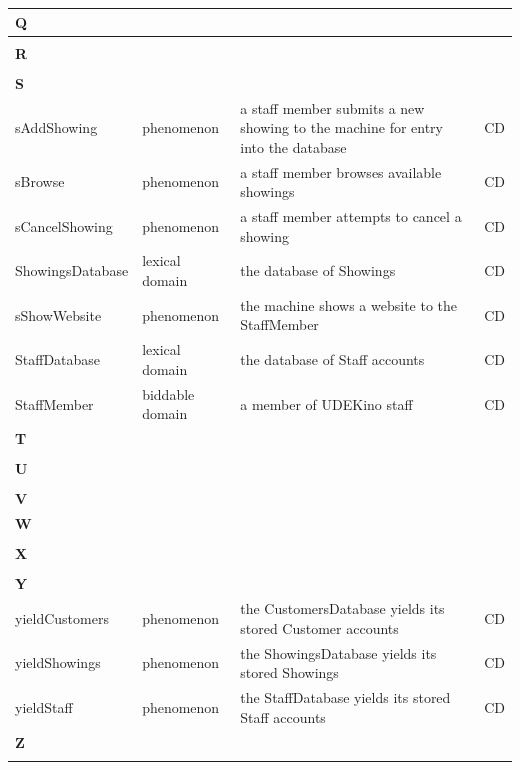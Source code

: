 \documentclass[a4paper,10pt,titlepage,bibtotoc,bibtotocnumbered]{scrreprt}
\begin{document}
\begin{longtable}{|l|l|p{5cm}|l|}
\hline
\multicolumn{4}{|l|}{\textbf{Q}}\\
\hline
&  &  & \\
\hline
\multicolumn{4}{|l|}{\textbf{R}}\\
\hline
&  &  & \\
\hline
\multicolumn{4}{|l|}{\textbf{S}}\\
\hline
sAddShowing & phenomenon & a staff member submits a new showing to the machine for entry into the database & CD\\
\hline
sBrowse & phenomenon & a staff member browses available showings & CD\\
\hline
sCancelShowing & phenomenon & a staff member attempts to cancel a showing & CD\\
\hline
ShowingsDatabase & lexical domain & the database of Showings & CD\\
\hline
sShowWebsite & phenomenon & the machine shows a website to the StaffMember & CD\\
\hline
StaffDatabase & lexical domain & the database of Staff accounts & CD\\
\hline
StaffMember & biddable domain & a member of UDEKino staff & CD\\
\hline
\multicolumn{4}{|l|}{\textbf{T}}\\
\hline
&  &  & \\
\hline
\multicolumn{4}{|l|}{\textbf{U}}\\
\hline
&  &  & \\
\hline
\multicolumn{4}{|l|}{\textbf{V}}\\
\hline
\hline
\multicolumn{4}{|l|}{\textbf{W}}\\
\hline
&  &  & \\
\hline
\multicolumn{4}{|l|}{\textbf{X}}\\
\hline
&  &  & \\
\hline
\multicolumn{4}{|l|}{\textbf{Y}}\\
\hline
yieldCustomers & phenomenon & the CustomersDatabase yields its stored Customer accounts & CD\\
\hline
yieldShowings & phenomenon & the ShowingsDatabase yields its stored Showings & CD\\
\hline
yieldStaff & phenomenon & the StaffDatabase yields its stored Staff accounts & CD\\
\hline
\multicolumn{4}{|l|}{\textbf{Z}}\\
\hline
 &  &  & \\
\hline
\end{longtable}
\end{document}
